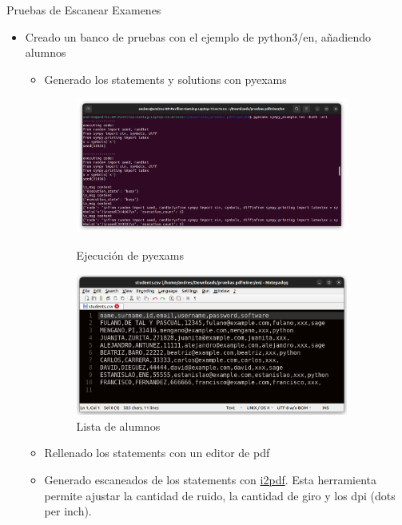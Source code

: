 Pruebas de Escanear Examenes

\begin{itemize}
    \item Creado un banco de pruebas con el ejemplo de python3/en, añadiendo alumnos
    \begin{itemize}
        \item Generado los statements y solutions con pyexams
\begin{figure}
    \centering
    \begin{minipage}{.5\textwidth}
        \centering
        \includegraphics[width=0.9\textwidth]{figures/exec_py_banco.png}
        \caption{Ejecución de pyexams}
        \label{fig:run_banc}
    \end{minipage}%
    \begin{minipage}{.5\textwidth}
        \centering
        \includegraphics[width=0.9\textwidth]{figures/alum_banco.png}
        \caption{Lista de alumnos}
        \label{fig:aluml_banc}
    \end{minipage}
\end{figure}
        \item Rellenado los statements con un editor de pdf
        \item Generado escaneados de los statements con \href{https://www.i2pdf.com/pdf-to-scan/}{i2pdf}. Esta herramienta permite ajustar la cantidad de ruido, la cantidad de giro y los dpi (dots per inch).

\end{itemize}
\end{itemize}
